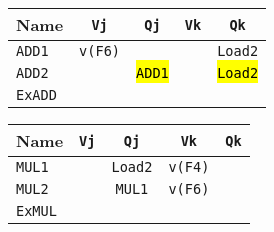 \begin{enumerate}
    \begin{table}[!htp]
        \centering
        \begin{tabular}{@{} l | c c c c @{}}
            \toprule
            Name            & \texttt{Vj}           & \texttt{Qj}                       & \texttt{Vk}           & \texttt{Qk}           \\
            \midrule
            \texttt{ADD1}   & \texttt{v(F6)}        &                                   &                       & \texttt{Load2}        \\ [.3em]
            \texttt{ADD2}   &                       & \hl{\texttt{ADD1}}                &                       & \hl{\texttt{Load2}}   \\
            \cmidrule{1-5}
            \texttt{ExADD}  &                       &                                   &                       &                       \\
            \bottomrule
        \end{tabular}
    \end{table}
    
    \begin{table}[!htp]
            \centering
            \begin{tabular}{@{} l | c c c c @{}}
                \toprule
                Name            & \texttt{Vj}   & \texttt{Qj}           & \texttt{Vk}           & \texttt{Qk}   \\
                \midrule
                \texttt{MUL1}   &               & \texttt{Load2}        & \texttt{v(F4)}        &               \\ [.3em]
                \texttt{MUL2}   &               & \texttt{MUL1}         & \texttt{v(F6)}        &               \\
                \cmidrule{1-5}
                \texttt{ExMUL}  &               &                       &                       &               \\
                \bottomrule
            \end{tabular}
    \end{table}


\end{enumerate}
